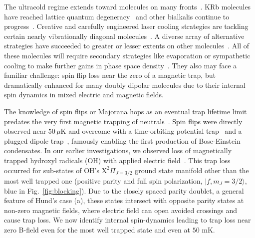 \documentclass[%
 reprint,
 amsmath,amssymb,
 aps,
prl,
]{revtex4-1}
\begin{document}
\maketitle


%
%
The ultracold regime extends toward molecules on many fronts~\cite{Carr2009}. KRb molecules have reached lattice quantum degeneracy~\cite{Moses2015} and other bialkalis continue to progress~\cite{Takekoshi2014, Park2015,Guo2016,Liu2017}. Creative and carefully engineered laser cooling strategies are tackling certain nearly vibrationally diagonal molecules~\cite{Stuhl2008,Shuman2010,Hummon2013, Barry2014, Zhelyazkova2014, Steinecker2016, Hemmerling2016}. A diverse array of alternative strategies have succeeded to greater or lesser extents on other molecules~\cite{Doyle1998, Bethlem1999, Bochinski2003, Narevicius2008, Wiederkehr2012, Prehn2016,Liu2017a}. All of these molecules will require secondary strategies like evaporation or sympathetic cooling to make further gains in phase space density~\cite{Parazzoli2011, Stuhl2012evap, Quemener2016}. They also may face a familiar challenge: spin flip loss near the zero of a magnetic trap, but dramatically enhanced for many doubly dipolar molecules due to their internal spin dynamics in mixed electric and magnetic fields. 

The knowledge of spin flips or Majorana hops as an eventual trap lifetime limit predates the very first magnetic trapping of neutrals~\cite{Migdall1985}. Spin flips were directly observed near $50\,\mu\text{K}$ and overcome with a time-orbiting potential trap~\cite{Petrich1995} and a plugged dipole trap~\cite{Davis1995}, famously enabling the first production of Bose-Einstein condensates. In our earlier investigations, we observed loss of magnetically trapped hydroxyl radicals (OH) with applied electric field~\cite{Stuhl2012uwave}. This trap loss occurred for sub-states of OH's $\mathrm{X}^2\Pi_{J=3/2}$ ground state manifold other than the most well trapped one (positive parity and full spin polarization, $|f,m_J=3/2\rangle$, blue in Fig.~\ref{fig:blocking}). Due to the closely spaced parity doublet, a general feature of Hund's case (a), these states intersect with opposite parity states at non-zero magnetic fields, where electric field can open avoided crossings and cause trap loss. We now identify internal spin-dynamics leading to trap loss near zero B-field even for the most well trapped state and even at $50\text{ mK}$.
\end{document}
